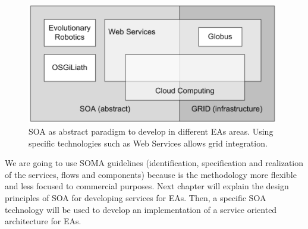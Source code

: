 \begin{figure}
\centering
\includegraphics[width=26pc]{gfx/soa/soagrid.jpg}
\caption{SOA as abstract paradigm to develop in different EAs areas. Using specific technologies such as Web Services allows grid integration.}
\label{fig:soagrid}
\end{figure}
We are going to use SOMA guidelines (identification, specification and realization of the services, flows and components) because is the methodology more flexible and less focused to commercial purposes. Next chapter will explain the design principles of SOA for developing services for EAs. Then, a specific SOA technology will be used to develop an implementation of a service oriented architecture for EAs.